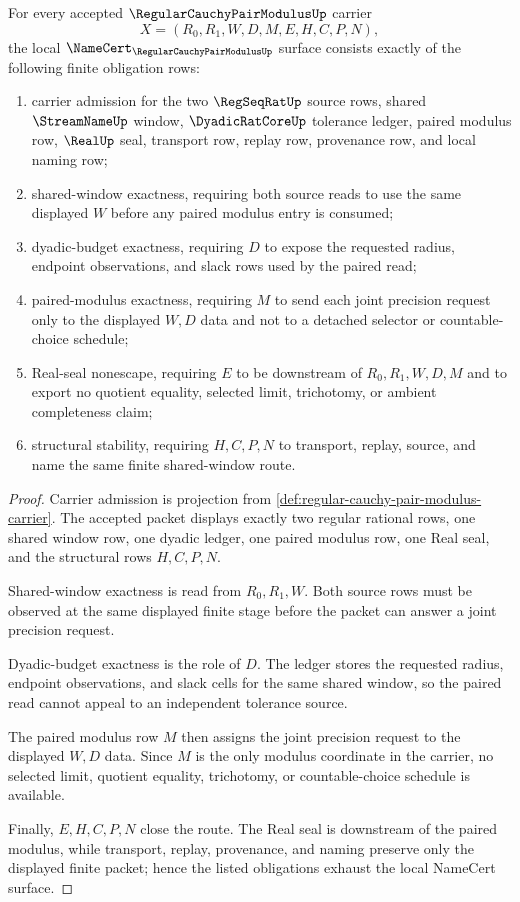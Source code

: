 \begin{theorem}
\label{thm:regular-cauchy-pair-modulus-namecert-obligations}
For every accepted $\RegularCauchyPairModulusUp$ carrier
$$
X=(R_0,R_1,W,D,M,E,H,C,P,N),
$$
the local $\NameCert_{\RegularCauchyPairModulusUp}$ surface consists exactly of the following finite obligation rows:
\begin{enumerate}
\item carrier admission for the two $\RegSeqRatUp$ source rows, shared $\StreamNameUp$ window, $\DyadicRatCoreUp$ tolerance ledger, paired modulus row, $\RealUp$ seal, transport row, replay row, provenance row, and local naming row;
\item shared-window exactness, requiring both source reads to use the same displayed $W$ before any paired modulus entry is consumed;
\item dyadic-budget exactness, requiring $D$ to expose the requested radius, endpoint observations, and slack rows used by the paired read;
\item paired-modulus exactness, requiring $M$ to send each joint precision request only to the displayed $W,D$ data and not to a detached selector or countable-choice schedule;
\item Real-seal nonescape, requiring $E$ to be downstream of $R_0,R_1,W,D,M$ and to export no quotient equality, selected limit, trichotomy, or ambient completeness claim;
\item structural stability, requiring $H,C,P,N$ to transport, replay, source, and name the same finite shared-window route.
\end{enumerate}
\end{theorem}
\begin{proof}
Carrier admission is projection from \autoref{def:regular-cauchy-pair-modulus-carrier}. The accepted packet displays exactly two regular rational rows, one shared window row, one dyadic ledger, one paired modulus row, one Real seal, and the structural rows $H,C,P,N$.

Shared-window exactness is read from $R_0,R_1,W$. Both source rows must be observed at the same displayed finite stage before the packet can answer a joint precision request.

Dyadic-budget exactness is the role of $D$. The ledger stores the requested radius, endpoint observations, and slack cells for the same shared window, so the paired read cannot appeal to an independent tolerance source.

The paired modulus row $M$ then assigns the joint precision request to the displayed $W,D$ data. Since $M$ is the only modulus coordinate in the carrier, no selected limit, quotient equality, trichotomy, or countable-choice schedule is available.

Finally, $E,H,C,P,N$ close the route. The Real seal is downstream of the paired modulus, while transport, replay, provenance, and naming preserve only the displayed finite packet; hence the listed obligations exhaust the local NameCert surface.
\end{proof}

